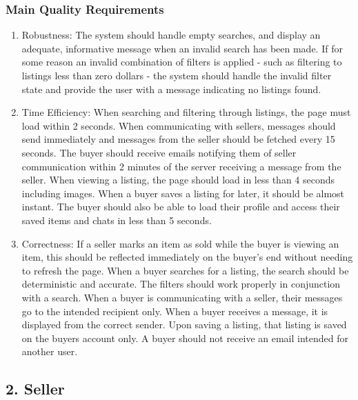 \documentclass[12pt]{article}
\begin{document}
\subsubsection*{Main Quality Requirements}
\begin{enumerate}[label=\arabic*.]
    \item Robustness: The system should handle
          empty searches, and display an adequate, informative message when an invalid search
          has been made. If for some reason an invalid combination of filters is applied - such
          as filtering to listings less than zero dollars - the system should handle the invalid
          filter state and provide the user with a message indicating no listings found.

    \item Time Efficiency: When searching and filtering through listings, the page
          must load within 2 seconds. When communicating with sellers, messages should send
          immediately and messages from the seller should be fetched every 15 seconds. The buyer
          should receive emails notifying them of seller communication within 2 minutes of the
          server receiving a message from the seller. When viewing a listing, the page should
          load in less than 4 seconds including images. When a buyer saves a listing for later,
          it should be almost instant. The buyer should also be able to load their profile and
          access their saved items and chats in less than 5 seconds.

    \item Correctness: If a seller marks an item as sold while the buyer is viewing an item, this
          should be reflected immediately on the buyer's end without needing to refresh the page. When a
          buyer searches for a listing, the search should be deterministic and accurate. The
          filters should work properly in conjunction with a search. When a buyer is
          communicating with a seller, their messages go to the intended recipient only. When a
          buyer receives a message, it is displayed from the correct sender. Upon saving a
          listing, that listing is saved on the buyers account only. A buyer should not receive
          an email intended for another user.
\end{enumerate}

\subsection*{2. Seller}
\end{document}
